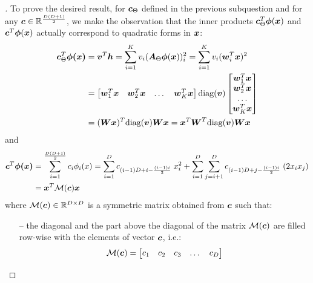 \begin{questions}
        \question
        \begin{proof}[\unskip\nopunct]
        To prove the desired result, for $\vb*{c}_{\Theta}$ defined in the previous subquestion and for any $\vb*{c} \in \mathbb{R}^{\frac{D(D + 1)}{2}}$, we make the observation that the inner products $\vb*{c}_{\Theta}^T  \vb*{\phi}(\vb*{x})$ and $\vb*{c}^T  \vb*{\phi}(\vb*{x})$ actually correspond to quadratic forms in $\vb*{x}$:
        \begin{align*}
            \vb*{c}_{\Theta}^T \vb*{\phi(x)} &= \vb*{v}^T \vb*{h} = \sum_{i = 1}^K v_i (\vb*{A}_{\Theta} \vb*{\phi}(\vb*{x}))^2_i = 
            \sum_{i = 1}^K v_i (\vb*{w}_i^T \vb*{x})^2 \\
            &= 
            \begin{bmatrix}
                \vb*{w}_1^T \vb*{x} & \vb*{w}_2^T \vb*{x} & \dots & \vb*{w}_K^T \vb*{x}
            \end{bmatrix}
            \text{diag}(\vb*{v})
            \begin{bmatrix}
                \vb*{w}_1^T \vb*{x} \\ \vb*{w}_2^T \vb*{x} \\ \dots \\ \vb*{w}_K^T \vb*{x}
            \end{bmatrix} \\
            &= (\vb*{Wx})^T \text{diag}(\vb*{v}) \vb*{Wx} 
             = \vb*{x}^T \vb*{W}^T \text{diag}(\vb*{v}) \vb*{Wx} 
        \end{align*}
        and 
        \begin{align*}
            \vb*{c}^T \vb*{\phi(x)} &= \sum_{i = 1}^{\frac{D(D + 1)}{2}} c_i \phi_i(x) = \sum_{i = 1}^{D} c_{(i - 1)D + i - \frac{(i - 1)i}{2}}\; x_i^2 + \sum_{i = 1}^{D}\sum_{j = i + 1}^{D} c_{(i - 1)D + j - \frac{(i - 1)i}{2}}\;(2 x_i x_j) \\
            &= \vb*{x}^T \mathcal{M}(\vb*{c}) \vb*{x}
        \end{align*}
        where $\mathcal{M}(\vb*{c}) \in \mathbb{R}^{D \times D}$ is a symmetric matrix obtained from $\vb*{c}$ such that:
        \begin{itemize}
            \item[--] the diagonal and the part above the diagonal of the matrix $\mathcal{M}(\vb*{c})$ are filled row-wise with the elements of vector $\vb*{c}$, i.e.:
            \[
                \mathcal{M}(\vb*{c}) = 
                \begin{bmatrix}
                    c_1 & c_2 & c_3 & \dots & c_D \\

\end{bmatrix}\]
\end{itemize}
\end{proof}
\end{questions}
